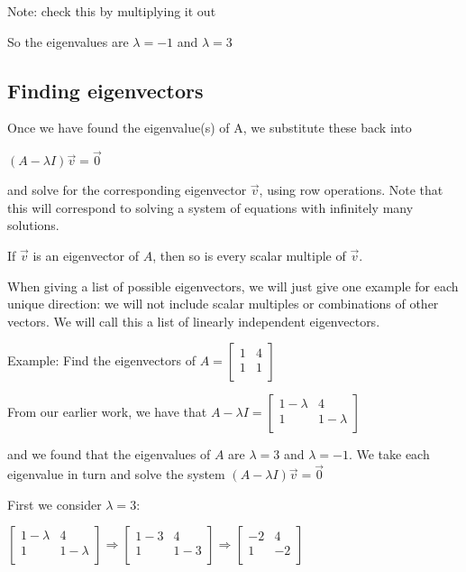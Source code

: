 \documentclass{extarticle}
\begin{document}
\begin{multicols}{4}
Note: check this by multiplying it out

So the eigenvalues are $\lambda=-1$ and $\lambda=3$


\subsection{Finding eigenvectors}
Once we have found the eigenvalue(s) of A, we substitute these back into

$\left(A-\lambda I\right)\vec{v}=\vec{0}$

and solve for the corresponding eigenvector $\vec{v}$, using row operations.
Note that this will correspond to solving a system of equations with infinitely many solutions.


If $\vec{v}$ is an eigenvector of $A$, then so is every scalar multiple of $\vec{v}$.

When giving a list of possible eigenvectors, we will just give one example for each unique direction: we will not include scalar multiples or combinations of other vectors. We will call this a list of linearly independent eigenvectors.


Example: Find the eigenvectors of $A=\left[\begin{matrix}1&4\\1&1\\\end{matrix}\right]$

From our earlier work, we have that $A-\lambda I=\left[\begin{matrix}1-\lambda&4\\1&1-\lambda\\\end{matrix}\right]$

and we found that the eigenvalues of $A$ are $\lambda=3$ and $\lambda=-1$. We take each eigenvalue in turn and solve the system $\left(A-\lambda I\right)\vec{v}=\vec{0}$

First we consider $\lambda=3$:

$\left[\begin{matrix}1-\lambda&4\\1&1-\lambda\\\end{matrix}\right]\Rightarrow\left[\begin{matrix}1-3&4\\1&1-3\\\end{matrix}\right]\Rightarrow\left[\begin{matrix}-2&4\\1&-2\\\end{matrix}\right]$


\end{multicols}
\end{document}
